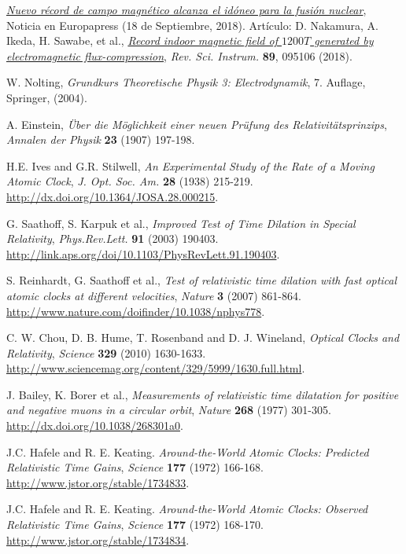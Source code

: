 \begin{thebibliography}{99}
\href{https://www.europapress.es/ciencia/laboratorio/noticia-nuevo-record-campo-magnetico-alcanza-idoneo-fusion-nuclear-20180918110647.html}{\textit{Nuevo récord de campo magnético alcanza el idóneo para la fusión nuclear}}, Noticia en Europapress (18 de Septiembre, 2018). Artículo: D. Nakamura, A. Ikeda, H. Sawabe, et al., \href{https://doi.org/10.1063/1.5044557}{\textit{Record indoor magnetic field of $1200 T$ generated by electromagnetic flux-compression}}, \textsl{Rev. Sci. Instrum.} \textbf{89}, 095106 (2018).



 W. Nolting, {\it Grundkurs Theoretische Physik 3: Electrodynamik}, 7. Auflage, Springer, (2004).

 A. Einstein, {\it \"Uber die Möglichkeit einer neuen Pr\"ufung des Relativitätsprinzips}, {\sl Annalen der Physik} {\bf 23} (1907) 197-198.

 H.E. Ives and G.R. Stilwell, {\it An Experimental Study of the Rate of a Moving Atomic Clock}, {\sl J. Opt. Soc. Am.} {\bf 28} (1938) 215-219. \url{http://dx.doi.org/10.1364/JOSA.28.000215}.

 G. Saathoff, S. Karpuk et al., {\it Improved Test of Time Dilation in Special Relativity}, {\sl Phys.Rev.Lett.} {\bf 91} (2003) 190403. \url{http://link.aps.org/doi/10.1103/PhysRevLett.91.190403}.

 S. Reinhardt, G. Saathoff et al., {\it Test of relativistic time dilation with fast optical atomic clocks at different velocities}, {\sl Nature} {\bf 3} (2007) 861-864. \url{http://www.nature.com/doifinder/10.1038/nphys778}.

 C. W. Chou, D. B. Hume, T. Rosenband and D. J. Wineland, {\em Optical Clocks and Relativity}, {\sl Science} {\bf 329} (2010) 1630-1633. \url{http://www.sciencemag.org/content/329/5999/1630.full.html}.

 J. Bailey, K. Borer et al., {\it Measurements of relativistic time dilatation for positive and negative muons in a circular orbit}, {\sl Nature} {\bf 268} (1977) 301-305. \url{http://dx.doi.org/10.1038/268301a0}.

 J.C. Hafele and R. E. Keating. {\it Around-the-World Atomic Clocks: Predicted Relativistic Time Gains}, {\sl Science} {\bf 177} (1972) 166-168. \url{http://www.jstor.org/stable/1734833}.

 J.C. Hafele and R. E. Keating. {\it Around-the-World Atomic Clocks: Observed Relativistic Time Gains}, {\sl Science} {\bf 177} (1972) 168-170. \url{http://www.jstor.org/stable/1734834}.


\end{thebibliography}
